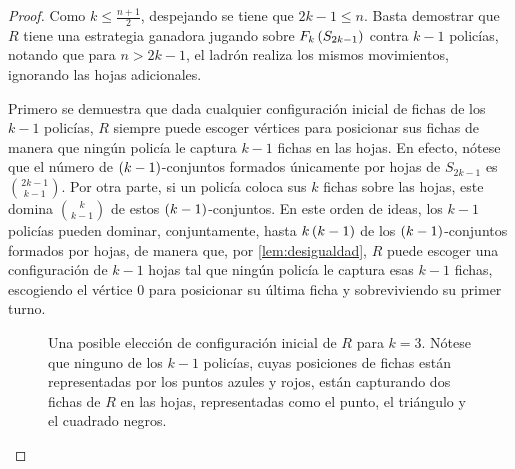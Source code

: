 \begin{proof}
    Como $k\leq \frac{n+1}{2}$, despejando se tiene que $2k-1 \leq n$. Basta
    demostrar que $R$ tiene una estrategia ganadora jugando sobre
    $F_{k}\left( S_{2k-1}\right)$ contra $k-1$ polic\'ias, notando que para $n > 2k-1$, el
    ladr\'on realiza los mismos movimientos, ignorando las hojas adicionales.

    Primero se demuestra que dada cualquier configuraci\'on inicial de fichas de
    los $k-1$ polic\'ias, $R$ siempre puede escoger v\'ertices para posicionar
    sus fichas de manera que ning\'un polic\'ia le captura $k-1$ fichas en las
    hojas. En efecto, n\'otese que el n\'umero de $\left( k-1\right)$-conjuntos
    formados \'unicamente por hojas de $S_{2k-1}$ es $\binom{2k-1}{k-1}$. Por
    otra parte, si un polic\'ia coloca sus $k$ fichas sobre las hojas, este
    domina $\binom{k}{k-1}$ de estos $\left( k-1\right)$-conjuntos. En este orden de
    ideas, los $k-1$ polic\'ias pueden dominar, conjuntamente, hasta
    $k\left( k-1\right)$ de los $\left( k-1\right)$-conjuntos formados por hojas, de manera
    que, por \cref{lem:desigualdad}, $R$ puede escoger una configuraci\'on de
    $k-1$ hojas tal que ning\'un polic\'ia le captura esas $k-1$ fichas,
    escogiendo el v\'ertice $0$ para posicionar su \'ultima ficha y
    sobreviviendo su primer turno.

    \begin{figure}[!htbp]
        \centering
        \captionsetup{font=footnotesize}
        \caption{Una posible elecci\'on de configuraci\'on inicial de $R$ para
        $k=3$. N\'otese que ninguno de los $k-1$ polic\'ias, cuyas posiciones de
        fichas est\'an representadas por los puntos azules y rojos, est\'an
        capturando dos fichas de $R$ en las hojas, representadas como el punto,
        el tri\'angulo y el cuadrado negros.}
        \label{fig:Configuracion_inicial}
    \end{figure}


\end{proof}
